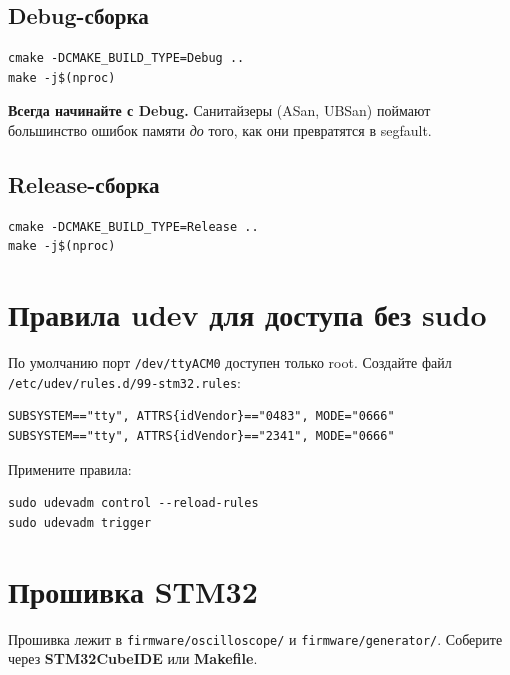 \subsection{Debug-сборка}

\begin{verbatim}
cmake -DCMAKE_BUILD_TYPE=Debug ..
make -j$(nproc)
\end{verbatim}

\begin{ideabox}
\textbf{Всегда начинайте с Debug.} Санитайзеры (ASan, UBSan)
поймают большинство ошибок памяти \emph{до} того, как они
превратятся в segfault.
\end{ideabox}

\subsection{Release-сборка}

\begin{verbatim}
cmake -DCMAKE_BUILD_TYPE=Release ..
make -j$(nproc)
\end{verbatim}

\section{Правила udev для доступа без sudo}

По умолчанию порт \texttt{/dev/ttyACM0} доступен только root.
Создайте файл \texttt{/etc/udev/rules.d/99-stm32.rules}:

\begin{verbatim}
SUBSYSTEM=="tty", ATTRS{idVendor}=="0483", MODE="0666"
SUBSYSTEM=="tty", ATTRS{idVendor}=="2341", MODE="0666"
\end{verbatim}

Примените правила:

\begin{verbatim}
sudo udevadm control --reload-rules
sudo udevadm trigger
\end{verbatim}

\section{Прошивка STM32}

Прошивка лежит в \texttt{firmware/oscilloscope/} и
\texttt{firmware/generator/}. Соберите через \textbf{STM32CubeIDE}
или \textbf{Makefile}.


